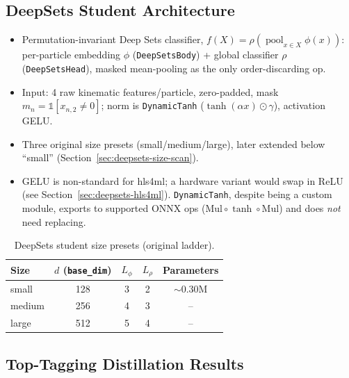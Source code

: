 \subsection{DeepSets Student Architecture}
\label{sec:deepsets-arch}

\begin{itemize}
    \item Permutation-invariant Deep Sets classifier,
    $f(X)=\rho(\operatorname{pool}_{x\in X}\phi(x))$: per-particle embedding
    $\phi$ (\texttt{DeepSetsBody}) + global classifier $\rho$
    (\texttt{DeepSetsHead}), masked mean-pooling as the only
    order-discarding op.
    \item Input: 4 raw kinematic features/particle, zero-padded, mask
    $m_n=\mathbb{1}[x_{n,2}\neq0]$; norm is \texttt{DynamicTanh}
    ($\tanh(\alpha x)\odot\gamma$), activation GELU.
    \item Three original size presets (small/medium/large), later extended
    below ``small'' (Section~\ref{sec:deepsets-size-scan}).
    \item GELU is non-standard for hls4ml; a hardware variant would swap in
    ReLU (see Section~\ref{sec:deepsets-hls4ml}). \texttt{DynamicTanh},
    despite being a custom module, exports to supported ONNX ops
    ($\mathrm{Mul}\circ\tanh\circ\mathrm{Mul}$) and does \emph{not} need
    replacing.
\end{itemize}

\begin{table}[h]
    \centering
    \begin{tabular}{lcccc}
        \toprule
        Size & $d$ (\texttt{base\_dim}) & $L_\phi$ & $L_\rho$ & Parameters \\
        \midrule
        small  & 128 & 3 & 2 & $\sim$0.30M \\
        medium & 256 & 4 & 3 & -- \\
        large  & 512 & 5 & 4 & -- \\
        \bottomrule
    \end{tabular}
    \caption{DeepSets student size presets (original ladder).}
    \label{tab:deepsets-sizes}
\end{table}

\subsection{Top-Tagging Distillation Results}
\label{sec:deepsets-mlp-comparison}

